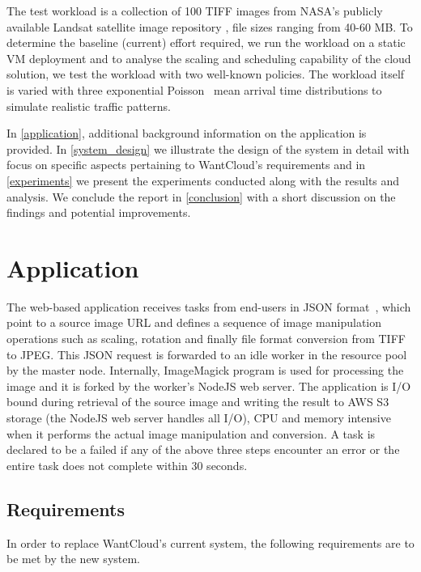 \documentclass[a4paper]{IEEEtran}
\begin{document}
The test workload is a collection of 100 TIFF images from NASA's publicly available Landsat satellite image repository \cite{landsat_s3}, file sizes ranging from 40-60 MB. To determine the baseline (current) effort required, we run the workload on a static VM deployment and to analyse the scaling and scheduling capability of the cloud solution, we test the workload with two well-known policies. The workload itself is varied with three exponential Poisson~\cite{jain1990art} mean arrival time distributions to simulate realistic traffic patterns.

In \autoref{application}, additional background information on the application is provided. In \autoref{system_design} we illustrate the design of the system in detail with focus on specific aspects pertaining to
WantCloud's requirements and in \autoref{experiments} we present the experiments conducted along with the
results and analysis. We conclude the report in \autoref{conclusion} with a short discussion on the findings and potential improvements.

\section{Application} \label{application}

The web-based application receives tasks from end-users in JSON format~\cite{rfc7159}, which point to a source image URL and defines a sequence of image manipulation operations such as scaling, rotation and finally file format conversion from TIFF to JPEG. This JSON request is forwarded to an idle worker in the resource pool by the master node. Internally, ImageMagick program is used for processing the image and it is forked by the worker's NodeJS web server. The application is I/O bound during retrieval of the source image and writing the result to AWS S3 storage (the NodeJS web server handles all I/O), CPU and memory intensive when it performs the actual image manipulation and conversion. A task is declared to be a failed if any of the above three steps encounter an error or the entire task does not complete within 30 seconds.

\subsection{Requirements}

In order to replace WantCloud's current system, the following requirements are to be met by the new system.
\end{document}
